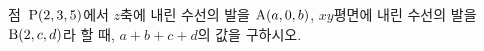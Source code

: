 점~$\mathrm{P}(2{,}\mkern3mu\mathopen{}3{,}\mkern3mu\mathopen{}5)$에서 $z$축에 내린 수선의 발을 $\mathrm{A}(a{,}\mkern3mu\mathopen{}0{,}\mkern3mu\mathopen{}b)$, $xy$평면에 내린 수선의 발을 $\mathrm{B}(2{,}\mkern3mu\mathopen{}c{,}\mkern3mu\mathopen{}d)$라 할 때, $a+b+c+d$의 값을 구하시오.
